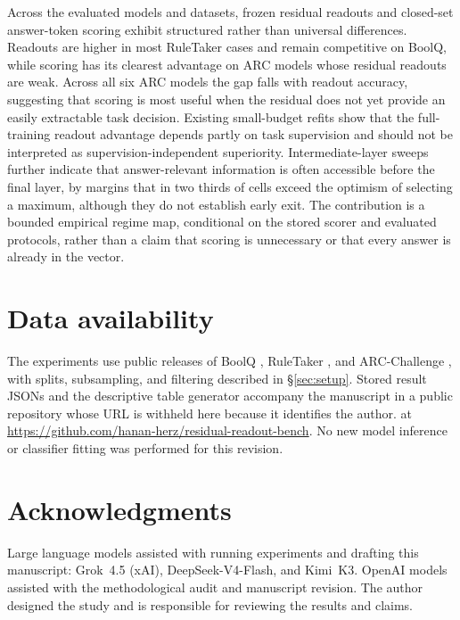 Across the evaluated models and datasets, frozen residual readouts and
closed-set answer-token scoring exhibit structured rather than universal
differences. Readouts are higher in most RuleTaker cases and remain
competitive on BoolQ, while scoring has its clearest advantage on ARC models
whose residual readouts are weak. Across all six ARC models the gap falls
with readout accuracy, suggesting that scoring is most useful when the
residual does not yet provide an easily extractable task decision. Existing
small-budget refits show that the full-training readout advantage depends
partly on task supervision and should not be interpreted as
supervision-independent superiority. Intermediate-layer sweeps further
indicate that answer-relevant information is often accessible before the
final layer, by margins that in two thirds of cells exceed the optimism of
selecting a maximum, although they do not establish early exit. The
contribution is a bounded empirical regime map, conditional on the stored
scorer and evaluated protocols, rather than a claim that scoring is
unnecessary or that every answer is already in the vector.

\section*{Data availability}
The experiments use public releases of BoolQ \citep{clark2019boolq},
RuleTaker \citep{clark2020ruletaker}, and ARC-Challenge
\citep{clark2018arc}, with splits, subsampling, and filtering described
in \S\ref{sec:setup}. Stored result JSONs and the descriptive table
generator accompany the manuscript in a public repository
\ifdefined\AnonymousVersion
whose URL is withheld here because it identifies the author.
\else
at \url{https://github.com/hanan-herz/residual-readout-bench}.
\fi
No new model inference or classifier fitting was performed for this revision.

\ifdefined\AnonymousVersion
\else
\section*{Acknowledgments}
Large language models assisted with running experiments and drafting this
manuscript: Grok~4.5 (xAI), DeepSeek-V4-Flash, and Kimi~K3. OpenAI models
assisted with the methodological audit and manuscript revision. The author
designed the study and is responsible for reviewing the results and claims.
\fi

\begingroup
\raggedright


\endgroup
